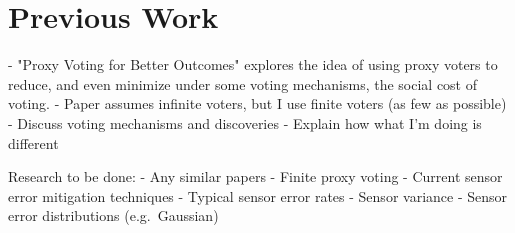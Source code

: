 \section{Previous Work}\label{sec:previous-work}
- "Proxy Voting for Better Outcomes"\cite{Cohensius2017} explores the idea of
  using proxy voters to reduce, and even minimize under some voting mechanisms,
  the social cost of voting.
    - Paper assumes infinite voters, but I use finite voters (as few as possible)
    - Discuss voting mechanisms and discoveries
    - Explain how what I'm doing is different

Research to be done:
- Any similar papers
- Finite proxy voting
- Current sensor error mitigation techniques
- Typical sensor error rates
- Sensor variance
- Sensor error distributions (e.g.\ Gaussian)

